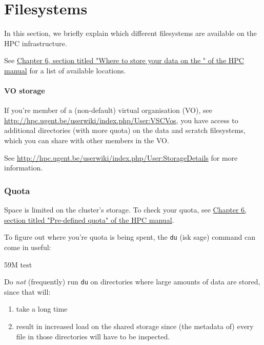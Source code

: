 \chapter{Filesystems}

In this section, we briefly explain which different filesystems are available on
the HPC infrastructure.

See \href{\HPCManualURL#predefined-user-directories}{Chapter 6, section titled "Where to store your data on the \hpc{}" of the HPC manual}
for a list of available locations.

\subsubsection{VO storage}

If you're member of a (non-default) virtual organisation (VO), see
\url{http://hpc.ugent.be/userwiki/index.php/User:VSCVos}, you have access to
additional directories (with more quota) on the data and scratch filesystems,
which you can share with other members in the VO.

See \url{http://hpc.ugent.be/userwiki/index.php/User:StorageDetails} for more
information.

\subsection{Quota}

Space is limited on the cluster's storage. To check your quota, see
\href{\HPCManualURL#predefined-quotas}{Chapter 6, section titled "Pre-defined quota" of the HPC manual}.

To figure out where you're quota is being spent, the \verb|du| (isk sage)
command can come in useful:

\begin{prompt}
59M   test
\end{prompt}

Do \emph{not} (frequently) run \verb|du| on directories where large amounts
of data are stored, since that will:
\begin{enumerate}
    \item take a long time
    \item result in increased
        load on the shared storage since (the metadata of) every file in those directories
        will have to be inspected.
\end{enumerate}
